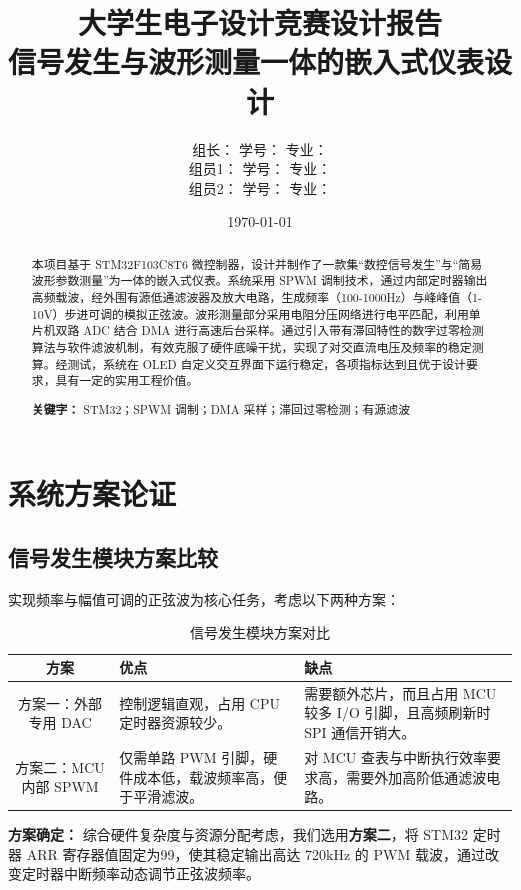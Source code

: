 \documentclass[a4paper,12pt]{ctexart}
\title{\vspace{2cm}\textbf{\Huge 大学生电子设计竞赛设计报告}\\\vspace{1cm}\Large 信号发生与波形测量一体的嵌入式仪表设计}
\author{
     组长：\underline{\makebox[3cm][c]{[姓名]}} \quad 学号：\underline{\makebox[3cm][c]{[学号]}} \quad 专业：\underline{\makebox[4cm][c]{电子信息科学与技术}}\\[1ex]
     组员1：\underline{\makebox[3cm][c]{朱彦霖}} \quad 学号：\underline{\makebox[3cm][c]{2411571}} \quad 专业：\underline{\makebox[4cm][c]{电子科学与技术}} \\[1ex]
     组员2：\underline{\makebox[3cm][c]{徐俊喆}} \quad 学号：\underline{\makebox[3cm][c]{2411954}} \quad 专业：\underline{\makebox[4cm][c]{电子信息科学与技术}}\\[1ex]
}
\date{\vspace{2cm}\today}
\begin{document}
\maketitle
\thispagestyle{empty} %
\newpage
\setcounter{page}{1}

\begin{abstract}
本项目基于 STM32F103C8T6 微控制器，设计并制作了一款集“数控信号发生”与“简易波形参数测量”为一体的嵌入式仪表。系统采用 SPWM 调制技术，通过内部定时器输出高频载波，经外围有源低通滤波器及放大电路，生成频率（100-1000Hz）与峰峰值（1-10V）步进可调的模拟正弦波。波形测量部分采用电阻分压网络进行电平匹配，利用单片机双路 ADC 结合 DMA 进行高速后台采样。通过引入带有滞回特性的数字过零检测算法与软件滤波机制，有效克服了硬件底噪干扰，实现了对交直流电压及频率的稳定测算。经测试，系统在 OLED 自定义交互界面下运行稳定，各项指标达到且优于设计要求，具有一定的实用工程价值。

\textbf{关键字：} STM32；SPWM 调制；DMA 采样；滞回过零检测；有源滤波
\end{abstract}

\section{系统方案论证}

\subsection{信号发生模块方案比较}
实现频率与幅值可调的正弦波为核心任务，考虑以下两种方案：

\begin{table}[H]
    \centering
    \caption{信号发生模块方案对比}
    \begin{tabular}{cp{6cm}p{4cm}}
        \toprule
        \textbf{方案} & \textbf{优点} & \textbf{缺点} \\
        \midrule
        方案一：外部专用 DAC & 控制逻辑直观，占用 CPU 定时器资源较少。 & 需要额外芯片，而且占用 MCU 较多 I/O 引脚，且高频刷新时 SPI 通信开销大。 \\
        方案二：MCU 内部 SPWM & 仅需单路 PWM 引脚，硬件成本低，载波频率高，便于平滑滤波。 & 对 MCU 查表与中断执行效率要求高，需要外加高阶低通滤波电路。 \\
        \bottomrule
    \end{tabular}
\end{table}
\textbf{方案确定：} 综合硬件复杂度与资源分配考虑，我们选用\textbf{方案二}，将 STM32 定时器 ARR 寄存器值固定为99，使其稳定输出高达 720kHz 的 PWM 载波，通过改变定时器中断频率动态调节正弦波频率。
\end{document}
